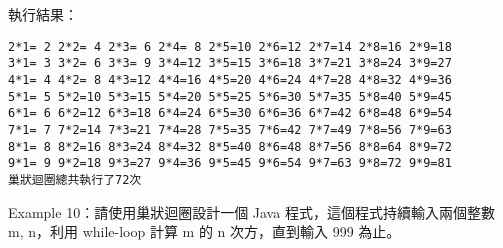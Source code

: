 \documentclass[a4paper,12pt,english]{sphinxmanual}
\begin{document}
執行結果：

\begin{Verbatim}[commandchars=@\[\]]
2*1= 2 2*2= 4 2*3= 6 2*4= 8 2*5=10 2*6=12 2*7=14 2*8=16 2*9=18
3*1= 3 3*2= 6 3*3= 9 3*4=12 3*5=15 3*6=18 3*7=21 3*8=24 3*9=27
4*1= 4 4*2= 8 4*3=12 4*4=16 4*5=20 4*6=24 4*7=28 4*8=32 4*9=36
5*1= 5 5*2=10 5*3=15 5*4=20 5*5=25 5*6=30 5*7=35 5*8=40 5*9=45
6*1= 6 6*2=12 6*3=18 6*4=24 6*5=30 6*6=36 6*7=42 6*8=48 6*9=54
7*1= 7 7*2=14 7*3=21 7*4=28 7*5=35 7*6=42 7*7=49 7*8=56 7*9=63
8*1= 8 8*2=16 8*3=24 8*4=32 8*5=40 8*6=48 8*7=56 8*8=64 8*9=72
9*1= 9 9*2=18 9*3=27 9*4=36 9*5=45 9*6=54 9*7=63 9*8=72 9*9=81
巢狀迴圈總共執行了72次
\end{Verbatim}

Example 10：請使用巢狀迴圈設計一個 Java 程式，這個程式持續輸入兩個整數 m, n，利用 while-loop 計算 m 的 n 次方，直到輸入 999 為止。
\end{document}
